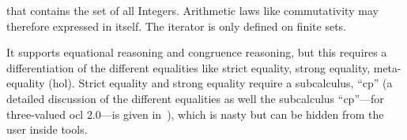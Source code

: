 \begin{compactenum}
  that contains the set of all Integers.  Arithmetic laws like
  commutativity may therefore expressed in \OCL itself.  The
  iterator is only defined on finite sets.
\item It supports equational reasoning and congruence reasoning, but
  this requires a differentiation of the different equalities like
  strict equality, strong equality, meta-equality (\acs{hol}). Strict
  equality and strong equality require a subcalculus, ``cp'' (a
  detailed discussion of the different equalities as well the
  subcalculus ``cp''---for three-valued \acs{ocl} 2.0---is given
  in~\cite{brucker.ea:semantics:2009}), which is nasty but can be
  hidden from the user inside tools.
\end{compactenum}



